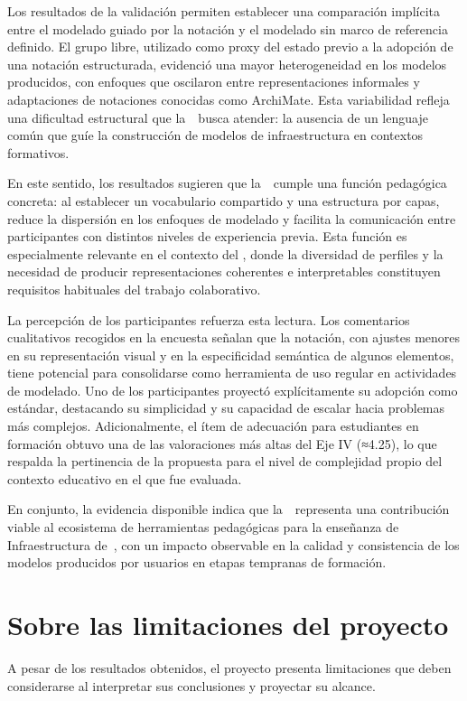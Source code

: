 Los resultados de la validación permiten establecer una comparación implícita entre el modelado guiado por la notación y el modelado sin marco de referencia definido. El grupo libre, utilizado como proxy del estado previo a la adopción de una notación estructurada, evidenció una mayor heterogeneidad en los modelos producidos, con enfoques que oscilaron entre representaciones informales y adaptaciones de notaciones conocidas como ArchiMate. Esta variabilidad refleja una dificultad estructural que la~\NDITI~busca atender: la ausencia de un lenguaje común que guíe la construcción de modelos de infraestructura en contextos formativos.

En este sentido, los resultados sugieren que la~\NDITI~cumple una función pedagógica concreta: al establecer un vocabulario compartido y una estructura por capas, reduce la dispersión en los enfoques de modelado y facilita la comunicación entre participantes con distintos niveles de experiencia previa. Esta función es especialmente relevante en el contexto del \GRID, donde la diversidad de perfiles y la necesidad de producir representaciones coherentes e interpretables constituyen requisitos habituales del trabajo colaborativo.

La percepción de los participantes refuerza esta lectura. Los comentarios cualitativos recogidos en la encuesta señalan que la notación, con ajustes menores en su representación visual y en la especificidad semántica de algunos elementos, tiene potencial para consolidarse como herramienta de uso regular en actividades de modelado. Uno de los participantes proyectó explícitamente su adopción como estándar, destacando su simplicidad y su capacidad de escalar hacia problemas más complejos. Adicionalmente, el ítem de adecuación para estudiantes en formación obtuvo una de las valoraciones más altas del Eje IV (≈4.25), lo que respalda la pertinencia de la propuesta para el nivel de complejidad propio del contexto educativo en el que fue evaluada.

En conjunto, la evidencia disponible indica que la~\NDITI~representa una contribución viable al ecosistema de herramientas pedagógicas para la enseñanza de Infraestructura de~\TI{}, con un impacto observable en la calidad y consistencia de los modelos producidos por usuarios en etapas tempranas de formación.

\section{Sobre las limitaciones del proyecto}
\noindent
A pesar de los resultados obtenidos, el proyecto presenta limitaciones que deben considerarse al interpretar sus conclusiones y proyectar su alcance.

